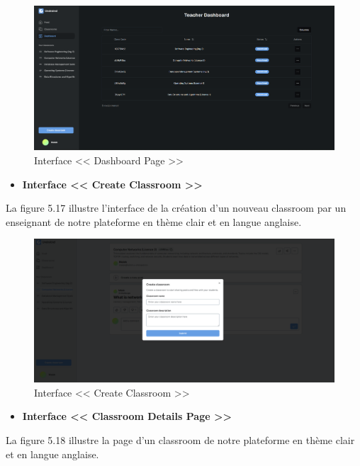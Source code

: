 \begin{figure}[H]
    \centering
    \includegraphics[width=1.1\textwidth,height=0.5\textwidth]{images/chp5/fig16.png}
    \caption{Interface << Dashboard Page >>}
    \label{Interface << Dashboard Page >>}    
\end{figure}
\begin{itemize}
    \item \textbf{Interface << Create Classroom >>}
\end{itemize}
La figure 5.17 illustre l'interface de la création d'un nouveau classroom  par un enseignant de notre plateforme en thème clair et en langue anglaise.
\begin{figure}[H]
    \centering
    \includegraphics[width=1.1\textwidth,height=0.5\textwidth]{images/chp5/fig17.png}
    \caption{Interface << Create Classroom >>}
    \label{Interface << Create Classroom >>}    
\end{figure}
\begin{itemize}
    \item \textbf{Interface << Classroom Details Page >>}
\end{itemize}
La figure 5.18 illustre la page d'un classroom de notre plateforme en thème clair et en langue anglaise.
